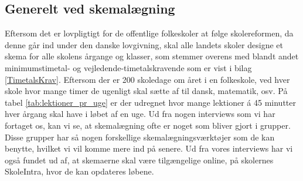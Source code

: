\subsection{Generelt ved skemalægning}
Eftersom det er lovpligtigt for de offentlige folkeskoler at følge skolereformen, da denne går ind under den danske lovgivning, skal alle landets skoler designe et skema for alle skolens årgange og klasser, som stemmer overens med blandt andet minimumstimetal- og vejledende-timetalskravende som er vist i bilag \ref{TimetalsKrav}. Eftersom der er 200 skoledage om året i en folkeskole\cite{elevers_timetal}, ved hver skole hvor mange timer de ugenligt skal sætte af til dansk, matematik, osv. På tabel \ref{tab:lektioner_pr_uge} er der udregnet hvor mange lektioner \'a 45 minutter hver årgang skal have i løbet af en uge. Ud fra nogen interviews som vi har fortaget os, kan vi se, at skemalægning ofte er noget som bliver gjort i grupper. Disse grupper har så nogen forskellige skemalægningsværktøjer som de kan benytte, hvilket vi vil komme mere ind på senere. Ud fra vores interviews har vi også fundet ud af, at skemaerne skal være tilgængelige online, på skolernes SkoleIntra, hvor de kan opdateres løbene.


